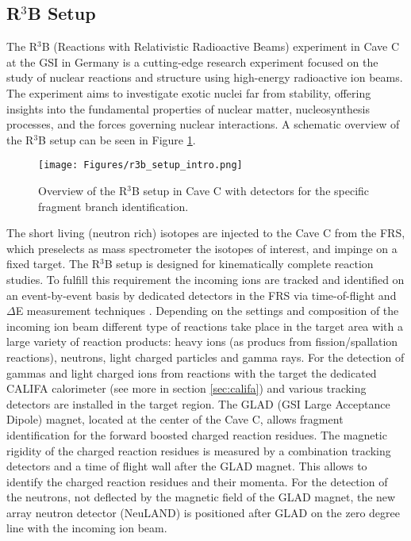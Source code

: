 \subsection{R$^3$B Setup}
The R$^3$B (Reactions with Relativistic Radioactive Beams) experiment in Cave C at the GSI in Germany is a cutting-edge research experiment focused on the study of nuclear reactions and structure using high-energy radioactive ion beams. The experiment aims to investigate exotic nuclei far from stability, offering insights into the fundamental properties of nuclear matter, nucleosynthesis processes, and the forces governing nuclear interactions. A schematic overview of the R$^3$B setup can be seen in Figure \ref{fig:r3b_setup_intro}.\newline
\begin{figure}[htpb]
    \centering
    \texttt{[image: Figures/r3b\_setup\_intro.png]}
    \caption{
    Overview of the R$^3$B setup in Cave C with detectors for the specific fragment branch identification.
    } 
    \label{fig:r3b_setup_intro}
\end{figure}
The short living (neutron rich) isotopes are injected to the Cave C from the FRS, which preselects as mass spectrometer the isotopes of interest, and impinge on a fixed target. The R$^3$B setup is designed for kinematically complete reaction studies. To fulfill this requirement the incoming ions are tracked and identified on an event-by-event basis by dedicated detectors in the FRS via time-of-flight and $\Delta$E measurement techniques \cite{nociforo2014time}. Depending on the settings and composition of the incoming ion beam different type of reactions take place in the target area with a large variety of reaction products: heavy ions (as producs from fission/spallation reactions), neutrons, light charged particles and gamma rays. For the detection of gammas and light charged ions from reactions with the target the dedicated CALIFA calorimeter (see more in section \ref{sec:califa}) and various tracking detectors are installed in the target region. The GLAD (GSI Large Acceptance Dipole) magnet, located at the center of the Cave C, allows fragment identification for the forward boosted charged reaction residues. The magnetic rigidity of the charged reaction residues is measured by a combination tracking detectors and a time of flight wall after the GLAD magnet. This allows to identify the charged reaction residues and their momenta. For the detection of the neutrons, not deflected by the magnetic field of the GLAD magnet, the new array neutron detector (NeuLAND) is positioned after GLAD on the zero degree line with the incoming ion beam.\newline
